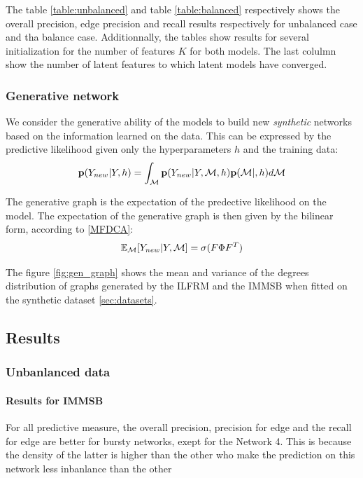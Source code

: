 The table \ref{table:unbalanced} and table \ref{table:balanced} respectively shows the overall precision, edge precision and recall results respectively for unbalanced case and tha balance case. Additionnally, the tables show results for several initialization for the number of features $K$ for both models. The last colulmn show the number of latent features to which latent models have converged.

\subsubsection{Generative network}
We consider the generative ability of the models to build new \emph{synthetic} networks based on the information learned on the data. This can be expressed by the predictive likelihood given only the hyperparameters $h$ and the training data:
\begin{equation}
    \mathbf{p}(Y_{new} |Y, h) = \int_{\mathcal{M}} \mathbf{p}(Y_{new} |Y,\mathcal{M}, h)\mathbf{p}(\mathcal{M} |, h)d\mathcal{M}
\end{equation}

The generative graph is the expectation of the predective likelihood on the model. The expectation of the generative graph is then given by the bilinear form, according to \ref{MFDCA}:
\begin{equation}
    \mathbb{E}_{\mathcal{M}}[Y_{new} | Y, \mathcal{M}] = \sigma(F \Phi F^T)
\end{equation}


The figure \ref{fig:gen_graph} shows the mean and variance of the degrees distribution of graphs generated by the ILFRM and the IMMSB when fitted on the synthetic dataset \ref{sec:datasets}.


\subsection{Results}

\subsubsection{Unbanlanced data}

\paragraph{Results for IMMSB}

For all predictive measure, the overall precision, precision for edge and the recall for edge are better for bursty networks, exept for the Network 4. This is because the density of the latter is higher than the other who make the prediction on this network less inbanlance than the other

